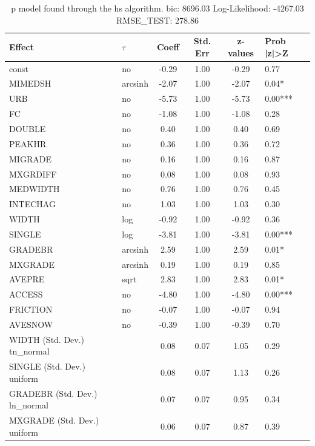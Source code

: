 \begin{table}
	\caption{p model found through the hs algorithm. bic: 8696.03 Log-Likelihood: -4267.03 RMSE_TEST: 278.86}
	\begin{center}
		\begin{tabular}{|l|l|c|c|c|l|}
			\hline
			Effect & $\tau$ & Coeff & Std. Err & z-values & Prob |z|>Z \\
			\hline
			const & no & -0.29 & 1.00 & -0.29 & 0.77 \\
			\hline
			MIMEDSH & arcsinh & -2.07 & 1.00 & -2.07 & 0.04* \\
			\hline
			URB & no & -5.73 & 1.00 & -5.73 & 0.00*** \\
			\hline
			FC & no & -1.08 & 1.00 & -1.08 & 0.28 \\
			\hline
			DOUBLE & no & 0.40 & 1.00 & 0.40 & 0.69 \\
			\hline
			PEAKHR & no & 0.36 & 1.00 & 0.36 & 0.72 \\
			\hline
			MIGRADE & no & 0.16 & 1.00 & 0.16 & 0.87 \\
			\hline
			MXGRDIFF & no & 0.08 & 1.00 & 0.08 & 0.93 \\
			\hline
			MEDWIDTH & no & 0.76 & 1.00 & 0.76 & 0.45 \\
			\hline
			INTECHAG & no & 1.03 & 1.00 & 1.03 & 0.30 \\
			\hline
			WIDTH & log & -0.92 & 1.00 & -0.92 & 0.36 \\
			\hline
			SINGLE & log & -3.81 & 1.00 & -3.81 & 0.00*** \\
			\hline
			GRADEBR & arcsinh & 2.59 & 1.00 & 2.59 & 0.01* \\
			\hline
			MXGRADE & arcsinh & 0.19 & 1.00 & 0.19 & 0.85 \\
			\hline
			AVEPRE & sqrt & 2.83 & 1.00 & 2.83 & 0.01* \\
			\hline
			ACCESS & no & -4.80 & 1.00 & -4.80 & 0.00*** \\
			\hline
			FRICTION & no & -0.07 & 1.00 & -0.07 & 0.94 \\
			\hline
			AVESNOW & no & -0.39 & 1.00 & -0.39 & 0.70 \\
			\hline
			WIDTH (Std. Dev.) tn_normal &  & 0.08 & 0.07 & 1.05 & 0.29 \\
			\hline
			SINGLE (Std. Dev.) uniform &  & 0.08 & 0.07 & 1.13 & 0.26 \\
			\hline
			GRADEBR (Std. Dev.) ln_normal &  & 0.07 & 0.07 & 0.95 & 0.34 \\
			\hline
			MXGRADE (Std. Dev.) uniform &  & 0.06 & 0.07 & 0.87 & 0.39 \\

\end{tabular}
\end{center}
\end{table}
